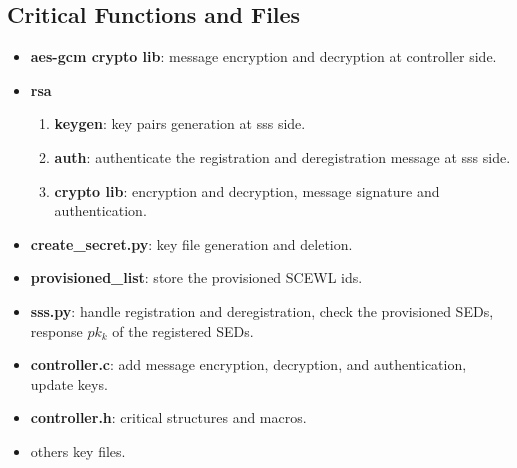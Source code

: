 \documentclass[11pt,oneside,onecolumn,letterpaper]{article}
\begin{document}
\subsection{Critical Functions and Files}
\begin{itemize}
  \item \textbf{aes-gcm crypto lib}: message encryption and decryption at controller side.
  \item \textbf{rsa}
  \begin{enumerate}
    \item \textbf{keygen}: key pairs generation at sss side.
    \item \textbf{auth}: authenticate the registration and deregistration message at sss side.
    \item \textbf{crypto lib}: encryption and decryption, message signature and authentication.
  \end{enumerate}
  \item \textbf{create\_secret.py}: key file generation and deletion.
  \item \textbf{provisioned\_list}: store the provisioned SCEWL ids.
  \item \textbf{sss.py}: handle registration and deregistration, check the provisioned SEDs, response $pk_k$ of  the registered SEDs.
  \item \textbf{controller.c}: add message encryption, decryption, and authentication, update keys.
  \item \textbf{controller.h}: critical structures and macros.
  \item others key files.
\end{itemize}



\end{document}
